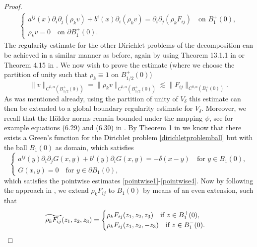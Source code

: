 \documentclass[12pt,a4paper]{article}
\theoremstyle{definition}
\theoremstyle{remark}
\numberwithin{equation}{section}
\newcommand\reallywidetilde[1]{\ThisStyle{%
  \setbox0=\hbox{$\SavedStyle#1$}%
  \stackengine{-.1\LMpt}{$\SavedStyle#1$}{%
    \stretchto{\scaleto{\SavedStyle\mkern.2mu\AC}{.5150\wd0}}{.6\ht0}%
  }{O}{c}{F}{T}{S}%
}}
\begin{document}
\begin{appendices}
\begin{proof}
\begin{align} \label{dirichletproblemball}
\begin{cases}
a^{ij} (x) \partial_i  \partial_j (\rho_k v) + b^i (x) \partial_i (\rho_k v) = \partial_i \partial_j (\rho_k  F_{ij}) \quad \text{on } B_1^+ (0), \\
\rho_k v = 0 \quad \text{on } \partial B_1^+ (0).
\end{cases}
\end{align}
The regularity estimate for the other Dirichlet problems of the decomposition can be achieved in a similar manner as before, again by using Theorem 13.1.1 in \cite{jostPDE} or Theorem 4.15 in \cite{gilbarg}. We now wish to prove the estimate (where we choose the partition of unity such that $\rho_k \equiv 1$ on $B^+_{1/2} (0)$)
\begin{equation*}
\lVert v \rVert_{C^{0,\alpha} (B_{1/2}^+ (0))} = \lVert \rho_k v \rVert_{C^{0,\alpha} (B_{1/2}^+ (0))} \lesssim \lVert F_{ij} \rVert_{C^{0,\alpha} (B_1^+ (0))}.
\end{equation*}
As was mentioned already, using the partition of unity of $V_\delta$ this estimate can then be extended to a global boundary regularity estimate for $V_\delta$. Moreover, we recall that the Hölder norms remain bounded under the mapping $\psi$, see for example equations (6.29) and (6.30) in \cite{gilbarg}. By Theorem 1 in \cite{dolzmann} we know that there exists a Green's function for the Dirichlet problem \eqref{dirichletproblemball} but with the ball $B_1 (0)$ as domain, which satisfies
\begin{equation}
\begin{cases}
a^{ij} (y) \partial_i  \partial_j G(x,y) + b^i (y) \partial_i G(x,y) = - \delta (x-y) \quad \text{for } y \in B_1 (0), \\
G(x, y) = 0 \quad \text{for } y \in \partial B_1 (0),
\end{cases}
\end{equation}
which satisfies the pointwise estimates \eqref{pointwise1}-\eqref{pointwise4}. Now by following the approach in \cite[~Theorem 4.11]{gilbarg}, we extend $\rho_k F_{ij}$ to $B_1 (0)$ by means of an even extension, such that
\begin{equation*}
\reallywidetilde{\rho_k F_{ij}} (z_1, z_2, z_3) = \begin{cases}
\rho_k F_{ij} (z_1, z_2, z_3) \quad \text{if } z \in B_1^+ (0), \\
\rho_k F_{ij} (z_1, z_2, -z_3) \quad \text{if } z \in B_1^- (0).
\end{cases}

\end{equation*}
\end{proof}
\end{appendices}
\end{document}

